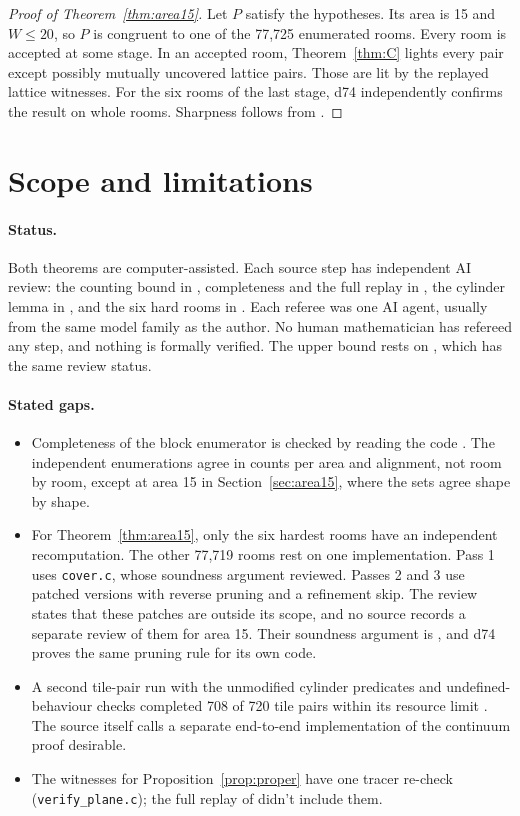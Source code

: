\documentclass[11pt]{article}
\theoremstyle{definition}
\theoremstyle{remark}
\begin{document}
\begin{proof}[Proof of Theorem~\ref{thm:area15}]
Let $P$ satisfy the hypotheses. Its area is 15 and $W\le20$, so $P$ is
congruent to one of the 77{,}725 enumerated rooms. Every room is accepted
at some stage. In an accepted room, Theorem~\ref{thm:C} lights every pair
except possibly mutually uncovered lattice pairs. Those are lit by the
replayed lattice witnesses. For the six rooms of the last stage, d74
independently confirms the result on whole rooms. Sharpness follows from
\cite{q22}.
\end{proof}

\section{Scope and limitations}\label{sec:scope}
\paragraph{Status.}
Both theorems are computer-assisted. Each source step has independent AI
review: the counting bound in \cite{d97}, completeness and the full replay
in \cite{d102}, the cylinder lemma in \cite{d96}, and the six hard rooms in
\cite{d74}. Each referee was one AI agent, usually from the same model
family as the author. No human mathematician has refereed any step, and
nothing is formally verified. The upper bound rests on \cite{q22}, which
has the same review status.

\paragraph{Stated gaps.}
\begin{itemize}
\item Completeness of the block enumerator is checked by reading the code
\cite[\S1]{d102}. The independent enumerations agree in counts per area
and alignment, not room by room, except at area 15 in
Section~\ref{sec:area15}, where the sets agree shape by shape.
\item For Theorem~\ref{thm:area15}, only the six hardest rooms have an
independent recomputation. The other 77{,}719 rooms rest on one
implementation. Pass 1 uses \texttt{cover.c}, whose soundness argument
\cite{d96} reviewed. Passes 2 and 3 use patched versions with reverse
pruning and a refinement skip. The review \cite{d96} states that these
patches are outside its scope, and no source records a separate review of
them for area 15. Their soundness argument is \cite[step 3]{offgrid}, and
d74 proves the same pruning rule for its own code.
\item A second tile-pair run with the unmodified cylinder predicates and
undefined-behaviour checks completed 708 of 720 tile pairs within its
resource limit \cite{offgrid}. The source itself calls a separate
end-to-end implementation of the continuum proof desirable.
\item The witnesses for Proposition~\ref{prop:proper} have one tracer
re-check (\texttt{verify\_plane.c}); the full replay of \cite{d102} didn't
include them.
\end{itemize}
\end{document}

